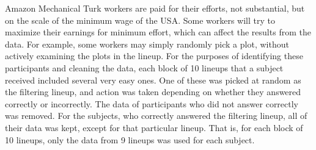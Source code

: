 \documentclass{article}
\begin{document}
Amazon Mechanical Turk workers are paid for their efforts, not substantial, but on the scale of the minimum wage of the USA. Some workers will try to maximize their earnings for minimum effort, which can affect the results from the data. For example, some workers may simply randomly pick a plot, without actively examining the plots in the lineup. For the purposes of identifying these participants and cleaning the data, each block of 10 lineups that a subject received included several very easy ones. One of these was picked at random as the filtering lineup, and action was taken depending on whether they answered correctly or incorrectly. The data of participants who did not answer correctly was removed. For the subjects, who correctly answered the filtering lineup, all of their data was kept, except for that particular lineup. That is, for each block of 10 lineups, only the data from 9 lineups was used for each subject.

\end{document}
